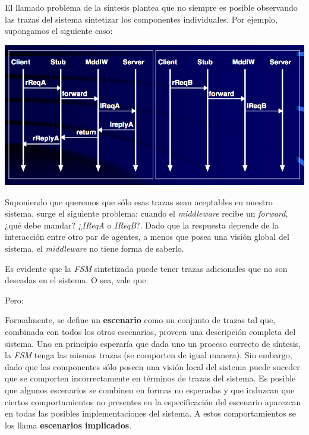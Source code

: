 \documentclass[]{article}
\begin{document}
El llamado problema de la síntesis plantea que no siempre es posible observando las trazas del sistema sintetizar los componentes individuales. Por ejemplo, supongamos el siguiente caso:

\begin{center}
	\includegraphics[scale=0.45]{Sintex.png}
\end{center}

Suponiendo que queremos que sólo esas trazas sean aceptables en nuestro sistema, surge el siguiente problema: cuando el \textit{middleware} recibe un \textit{forward}, ¿qué debe mandar? ¿\textit{IReqA} o \textit{IReqB}?. Dado que la respuesta depende de la interacción entre otro par de agentes, a menos que posea una visión global del sistema, el \textit{middleware} no tiene forma de saberlo.

Es evidente que la \textit{FSM} sintetizada puede tener trazas adicionales que no son deseadas en el sistema. O sea, vale que:
\begin{center}
\end{center}

Pero:
\begin{center}
\end{center}

Formalmente, se define un \textbf{escenario} como un conjunto de trazas tal que, combinada con todos los otros escenarios, proveen una descripción completa del sistema. Uno en principio esperaría que dada uno un proceso correcto de síntesis, la \textit{FSM} tenga las mismas trazas (se comporten de igual manera). Sin embargo, dado que las componentes sólo poseen una visión local del sistema puede suceder que se comporten incorrectamente en términos de trazas del sistema. Es posible que algunos escenarios se combinen en formas no esperadas y que induzcan que ciertos comportamientos no presentes en la especificación del escenario aparezcan en todas las posibles implementaciones del sistema. A estos comportamientos se los llama \textbf{escenarios implicados}.
\end{document}
